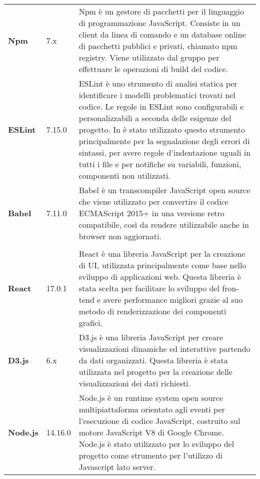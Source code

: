 {\begin{longtable}{C{3cm} C{2cm} C{10cm}}
 	\textbf{Npm} & 
	7.x &
	Npm è un gestore di pacchetti per il linguaggio di programmazione JavaScript. Consiste in un client da linea di comando e un database online di pacchetti pubblici e privati, chiamato npm registry. Viene utilizzato dal gruppo per effettuare le operazioni di build del codice. \\
 
 \textbf{ESLint} & 
	7.15.0  &
	ESLint è uno strumento di analisi statica per identificare i modelli problematici trovati nel codice. Le regole in ESLint sono configurabili e personalizzabili a seconda delle esigenze del progetto.
In \NomeProgetto{} è stato utilizzato questo strumento principalmente per la segnalazione degli errori di sintassi, per avere regole  d'indentazione uguali in tutti i file e per notifiche su variabili, funzioni, componenti non utilizzati. \\
 
	\textbf{Babel} & 
	7.11.0 &
	Babel è un transcompiler JavaScript open source che viene utilizzato per convertire il codice ECMAScript 2015+ in una versione retro compatibile, così da rendere \NomeProgetto{} utilizzabile anche in browser non aggiornati. \\
  
\\
 
	\textbf{React} & 
	17.0.1 &
	React è una libreria JavaScript per la creazione di UI, utilizzata principalmente come base nello sviluppo di applicazioni web.
Questa libreria è stata scelta per facilitare lo sviluppo del fron-tend e avere performance migliori grazie al suo metodo di renderizzazione dei componenti grafici.\\ 
 
 	\textbf{D3.js} & 
	6.x &
	D3.js è una libreria JavaScript per creare visualizzazioni dinamiche ed interattive partendo da dati organizzati.
Questa libreria è stata utilizzata nel progetto \NomeProgetto{} per la creazione delle visualizzazioni dei dati richiesti.\\

	\textbf{Node.js} & 
	14.16.0 &
	Node.js è un runtime system open source multipiattaforma orientato agli eventi per l'esecuzione di codice JavaScript, costruito sul motore JavaScript V8 di Google Chrome.
Node.js è stato utilizzato per lo sviluppo del progetto \NomeProgetto{} come strumento per l'utilizzo di Javascript lato server.\\
 

\end{longtable}}
